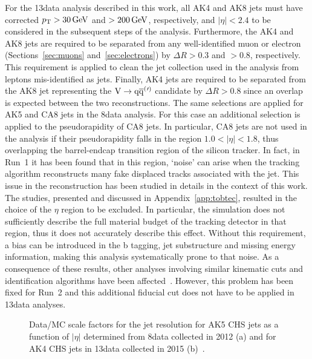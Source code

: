 For the 13\TeV data analysis described in this work, all AK4 and AK8 jets must have corrected $p_{\mathrm{T}} > 30\,\text{Ge\hspace{-.08em}V}$ and $> 200\,\text{Ge\hspace{-.08em}V}$, respectively, and $|\eta| < 2.4$ to be considered in the subsequent steps of the analysis.
Furthermore, the AK4 and AK8 jets are required to be separated from any well-identified muon or electron (Sections~\ref{sec:muons} and~\ref{sec:electrons}) by $\Delta R > 0.3$ and $> 0.8$, respectively. This requirement is applied to clean the jet collection used in the analysis from leptons mis-identified as jets. Finally, AK4 jets are required to be separated from the AK8 jet representing the $\mathrm{V}\to\mathrm{q}\overline{\mathrm{q}}^({}'^){}$ candidate by $\Delta R > 0.8$ since an overlap is expected between the two reconstructions. The same selections are applied for AK5 and CA8 jets in the 8\TeV data analysis. For this case an additional selection is applied to the pseudorapidity of CA8 jets.
In particular, CA8 jets are not used in the analysis if their pseudorapidity falls in the region $1.0 < |\eta| < 1.8$, thus overlapping the barrel-endcap transition region of the silicon tracker.
In fact, in Run~1 it has been found that in this region, `noise' can arise when the tracking algorithm reconstructs many fake displaced tracks associated with the jet.
This issue in the reconstruction has been studied in details in the context of this work. The studies, presented and discussed in Appendix~\ref{app:tobtec}, resulted in the choice of the $\eta$ region to be excluded.
In particular, the simulation does not sufficiently describe the full material budget of the tracking detector in that region, thus it does not accurately describe this effect.
Without this requirement, a bias can be introduced in the b tagging, jet substructure and missing energy information, making this analysis systematically prone to that noise.
As a consequence of these results, other analyses involving similar kinematic cuts and identification algorithms have been affected~\cite{CMS-PAS-EXO-15-008}.
However, this problem has been fixed for Run~2 and this additional fiducial cut does not have to be applied in 13\TeV data analyses.

\begin{figure}[!htb]
\begin{center}
\end{center} 
\caption{Data/MC scale factors for the jet \pt resolution for AK5 CHS jets as a function of $|\eta|$ determined from 8\TeV data collected in 2012 (a) and for AK4 CHS jets in 13\TeV data collected in 2015 (b)~\cite{Khachatryan:2016kdb,CMS-DP-2016-020}.}
\label{fig:resolcorr813TeV}
\end{figure}

